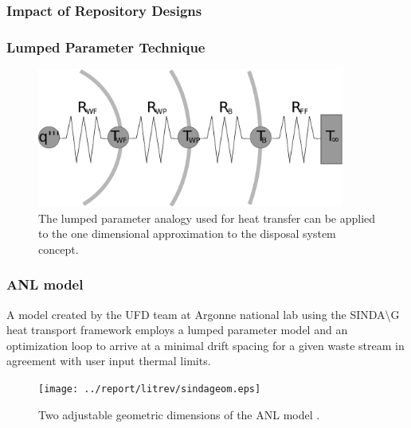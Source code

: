\begin{frame}[ctb!]
  \frametitle{Impact of Repository Designs}
   
\end{frame}




\begin{frame}[ctb!]
  \frametitle{Lumped Parameter Technique}
  \begin{figure}[h!]
    \begin{center}
      \includegraphics[width=0.9\textwidth]{lumpedParam.eps}
    \end{center}
    \caption{The lumped parameter analogy used for heat transfer can be applied 
    to the one dimensional approximation to the disposal system concept. }
    \label{fig:lumpedParam}
  \end{figure}
  
\end{frame}



\begin{frame}
  \frametitle{ANL model}
  A model created by the UFD team at Argonne national lab using the 
  SINDA{\textbackslash}G heat transport framework employs a lumped parameter 
  model and an optimization loop to arrive at a minimal drift spacing for a 
  given waste stream in agreement with user input thermal limits. 
  \begin{figure}[h!]
    \begin{center}
      \texttt{[image: ../report/litrev/sindageom.eps]}
    \end{center}
    \caption{Two adjustable geometric dimensions of the ANL model 
    \cite{bauer_something_2010}.}
    \label{fig:sindageom}
  \end{figure}
\end{frame}


